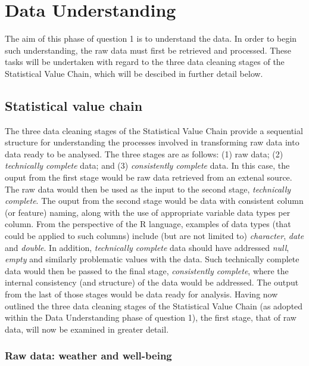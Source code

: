 \documentclass[12pt, oneside, openany]{book}
\begin{document}
\section*{Data Understanding}
The aim of this phase of question 1 is to understand the data. In order to begin such understanding, the raw data must first be retrieved and processed. These tasks will be undertaken with regard to the three data cleaning stages of the Statistical Value Chain, which will be descibed in further detail below.
  
\subsection*{Statistical value chain}
The three data cleaning stages of the Statistical Value Chain provide a sequential structure for understanding the processes involved in transforming raw data into data ready to be analysed. The three stages are as follows: (1) raw data; (2) \emph{technically complete} data; and (3) \emph{consistently complete} data. In this case, the ouput from the first stage would be raw data retrieved from an extenal source. The raw data would then be used as the input to the second stage, \emph{technically complete}. The ouput from the second stage would be data with consistent column (or feature) naming, along with the use of appropriate variable data types per column. From the perspective of the R language\cite{rTypes}, examples of data types (that could be applied to such columns) include (but are not limited to) \emph{character}, \emph{date} and \emph{double}. In addition, \emph{technically complete} data should have addressed \emph{null}, \emph{empty} and similarly problematic values with the data. Such technically complete data would then be passed to the final stage, \emph{consistently complete}, where the internal consistency (and structure) of the data would be addressed. The output from the last of those stages would be data ready for analysis. Having now outlined the three data cleaning stages of the Statistical Value Chain (as adopted within the Data Understanding phase of question 1), the first stage, that of raw data, will now be examined in greater detail.

\subsubsection*{Raw data: weather and well-being}
\end{document}
